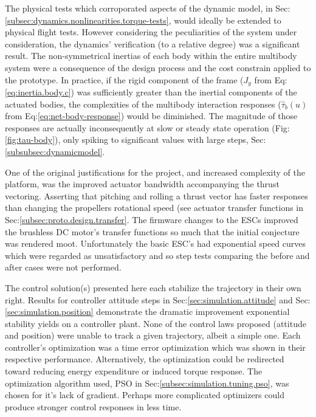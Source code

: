 The physical tests which corroporated aspects of the dynamic model, in Sec:\ref{subsec:dynamics.nonlinearities.torque-tests}, would ideally be extended to physical flight tests. However considering the peculiarities of the system under consideration, the dynamics' verification (to a relative degree) was a significant result. The non-symmetrical inertias of each body within the entire multibody system were a consequence of the design process and the cost constrain applied to the prototype. In practice, if the rigid component of the frame ($J_y$ from Eq:\ref{eq:inertia.body.c}) was sufficiently greater than the inertial components of the actuated bodies, the complexities of the multibody interaction responses ($\hat{\tau}_b(u)$ from Eq:\ref{eq:net-body-response}) would be diminished. The magnitude of those responses are actually inconsequently at slow or steady state operation (Fig:\ref{fig:tau-body}), only spiking to significant values with large steps, Sec:\ref{subsubsec:dynamicmodel}.
\par
One of the original justifications for the project, and increased complexity of the platform, was the improved actuator bandwidth accompanying the thrust vectoring. Asserting that pitching and rolling a thrust vector has faster responses than changing the propellers rotational speed (see actuator transfer functions in Sec:\ref{subsec:proto.design.transfer}. The firmware changes to the ESCs improved the brushless DC motor's transfer functions so much that the initial conjecture was rendered moot. Unfortunately the basic ESC's had exponential speed curves which were regarded as unsatisfactory and so step tests comparing the before and after cases were not performed.
\par
The control solution(s) presented here each stabilize the trajectory in their own right. Results for controller attitude steps in Sec:\ref{sec:simulation.attitude} and Sec:\ref{sec:simulation.position} demonstrate the dramatic improvement exponential stability yields on a controller plant. None of the control laws proposed (attitude and position) were unable to track a given trajectory, albeit a simple one. Each controller's optimization was a time error optimization which was shown in their respective performance. Alternatively, the optimization could be redirected toward reducing energy expenditure or induced torque response. The optimization algorithm used, PSO in Sec:\ref{subsec:simulation.tuning.pso}, was chosen for it's lack of gradient. Perhaps more complicated optimizers could produce stronger control responses in less time. 
